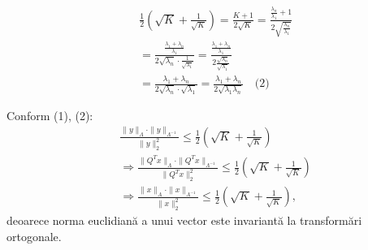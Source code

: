 \begin{demonstratie}
    \bigskip

    \begin{observatie}
    \begin{align*}
        &\frac{1}{2} \left( \sqrt{K} + \frac{1}{\sqrt{K}} \right) = \frac{K + 1}{2 \sqrt{K}} = \frac{\frac{\lambda_n}{\lambda_1} + 1}{2 \sqrt{\frac{\lambda_n}{\lambda_1}}} \\
        &= \frac{\frac{\lambda_1 + \lambda_n}{\lambda_1}}{2 \sqrt{\lambda_n} \cdot \frac{1}{\sqrt{\lambda_1}}} = \frac{\frac{\lambda_1 + \lambda_n}{\lambda_1}}{2 \frac{\sqrt{\lambda_n}}{\sqrt{\lambda_1}}} \\
        &= \frac{\lambda_1 + \lambda_n}{2 \sqrt{\lambda_n} \cdot \sqrt{\lambda_1}} = \frac{\lambda_1 + \lambda_n}{2 \sqrt{\lambda_1 \lambda_n}} \quad \text{(2)}
    \end{align*}
    \end{observatie}

    Conform (1), (2):
    \begin{align*}
        &\frac{\|y\|_\Lambda \cdot \|y\|_{\Lambda^{-1}}}{\|y\|_2^2} \le \frac{1}{2} \left( \sqrt{K} + \frac{1}{\sqrt{K}} \right) \\
        &\Rightarrow \frac{\|Q^T x\|_\Lambda \cdot \|Q^T x\|_{\Lambda^{-1}}}{\|Q^T x\|_2^2} \le \frac{1}{2} \left( \sqrt{K} + \frac{1}{\sqrt{K}} \right) \\
        &\Rightarrow \frac{\|x\|_A \cdot \|x\|_{A^{-1}}}{\|x\|_2^2} \le \frac{1}{2} \left( \sqrt{K} + \frac{1}{\sqrt{K}} \right),
    \end{align*}
    deoarece norma euclidiană a unui vector este invariantă la transformări ortogonale. 

\end{demonstratie}